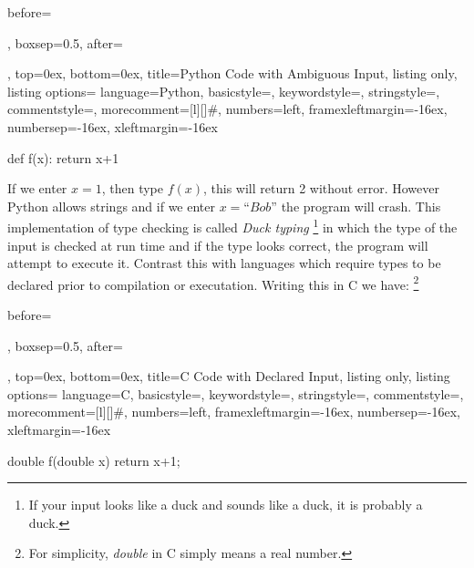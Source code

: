         \par
        \begin{tcblisting}{
            before=\par\vspace{2ex},
            boxsep=0.5\topsep,
            after=\par\vspace{2ex},
            top=0ex,
            bottom=0ex,
            title=Python Code with Ambiguous Input,
            listing only,
            listing options={
                language=Python,
                basicstyle=\ttfamily,
                keywordstyle=\color{blue}\ttfamily,
                stringstyle=\color{red}\ttfamily,
                commentstyle=\color{green}\ttfamily,
                morecomment={[l][\color{magenta}]{\#}},
                numbers=left,
                framexleftmargin=-16ex,
                numbersep=-16ex,
                xleftmargin=-16ex
            }
        }
            def f(x):
                return x+1
        \end{tcblisting}
        If we enter $x=1$, then type $f(x)$, this will return 2 without error.
        However Python allows strings and if we enter $x=\textit{``Bob''}$ the
        program will crash. This implementation of type checking is called
        \textit{Duck typing}%
        \footnote{%
            If your input looks like a duck and sounds like a duck, it is
            probably a duck.
        }
        in which the type of the input is checked at run time and if the type
        looks correct, the program will attempt to execute it. Contrast this
        with languages which require types to be declared prior to compilation
        or executation. Writing this in C we have:%
        \footnote{%
            For simplicity, \textit{double} in C simply means a real number.
        }
        \begin{tcblisting}{
            before=\par\vspace{2ex},
            boxsep=0.5\topsep,
            after=\par\vspace{2ex},
            top=0ex,
            bottom=0ex,
            title=C Code with Declared Input,
            listing only,
            listing options={
                language=C,
                basicstyle=\ttfamily,
                keywordstyle=\color{blue}\ttfamily,
                stringstyle=\color{red}\ttfamily,
                commentstyle=\color{green}\ttfamily,
                morecomment={[l][\color{magenta}]{\#}},
                numbers=left,
                framexleftmargin=-16ex,
                numbersep=-16ex,
                xleftmargin=-16ex
            }
        }
            double f(double x){
                return x+1;
            }
        \end{tcblisting}
